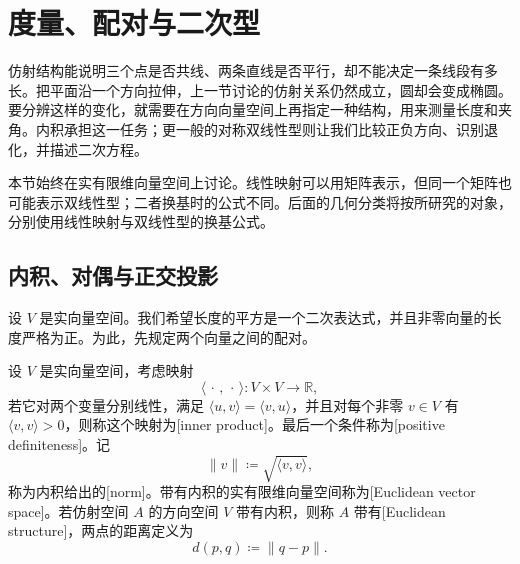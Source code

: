 
% 
% 

\section{度量、配对与二次型}
\label{g1:sec:0102}

仿射结构能说明三个点是否共线、两条直线是否平行，却不能决定一条线段有多长。把平面沿一个方向拉伸，上一节讨论的仿射关系仍然成立，圆却会变成椭圆。要分辨这样的变化，就需要在方向向量空间上再指定一种结构，用来测量长度和夹角。内积承担这一任务；更一般的对称双线性型则让我们比较正负方向、识别退化，并描述二次方程。

\ProseParagraphBreak

本节始终在实有限维向量空间上讨论。线性映射可以用矩阵表示，但同一个矩阵也可能表示双线性型；二者换基时的公式不同。后面的几何分类将按所研究的对象，分别使用线性映射与双线性型的换基公式。

\subsection{内积、对偶与正交投影}
\label{g1:subsec:0102:01}

设 \(V\) 是实向量空间。我们希望长度的平方是一个二次表达式，并且非零向量的长度严格为正。为此，先规定两个向量之间的配对。

\begin{definition}
	\label{g1:def:inner-product}
	设 \(V\) 是实向量空间，考虑映射
	\[
		\langle\,\cdot\,,\,\cdot\,\rangle\colon V\times V\longrightarrow\mathbb R,
	\]
	若它对两个变量分别线性，满足 \(\langle u,v\rangle=\langle v,u\rangle\)，并且对每个非零 \(v\in V\) 有 \(\langle v,v\rangle>0\)，则称这个映射为[inner product]。最后一个条件称为[positive definiteness]。记
	\[
		\lVert v\rVert\coloneqq\sqrt{\langle v,v\rangle},
	\]
	称为内积给出的[norm]。带有内积的实有限维向量空间称为[Euclidean vector space]。若仿射空间 \(A\) 的方向空间 \(V\) 带有内积，则称 \(A\) 带有[Euclidean structure]，两点的距离定义为
	\[
		d(p,q)\coloneqq\lVert q-p\rVert.
	\]
\end{definition}

